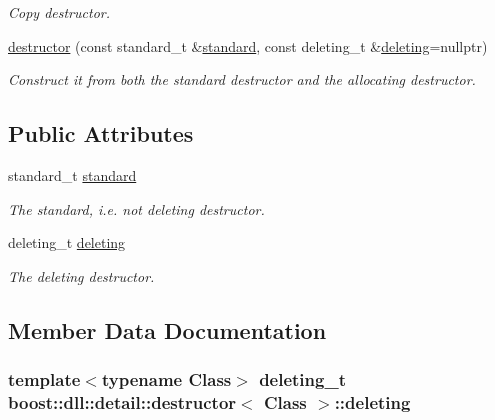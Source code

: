 \begin{DoxyCompactItemize}
\begin{DoxyCompactList}\small\item\em Copy destructor. \end{DoxyCompactList}\item 
\hyperlink{a00076_abc1f0cdcc708f43049b7d11727e24f24}{destructor} (const standard\+\_\+t \&\hyperlink{a00076_a5c588780f2142ca3492ea78c62fe472c}{standard}, const deleting\+\_\+t \&\hyperlink{a00076_a96ad279626c7f9b845d47582f9f88dc0}{deleting}=nullptr)\hypertarget{a00076_abc1f0cdcc708f43049b7d11727e24f24}{}\label{a00076_abc1f0cdcc708f43049b7d11727e24f24}

\begin{DoxyCompactList}\small\item\em Construct it from both the standard destructor and the allocating destructor. \end{DoxyCompactList}\end{DoxyCompactItemize}
\subsection*{Public Attributes}
\begin{DoxyCompactItemize}
\item 
standard\+\_\+t \hyperlink{a00076_a5c588780f2142ca3492ea78c62fe472c}{standard}
\begin{DoxyCompactList}\small\item\em The standard, i.\+e. not deleting destructor. \end{DoxyCompactList}\item 
deleting\+\_\+t \hyperlink{a00076_a96ad279626c7f9b845d47582f9f88dc0}{deleting}
\begin{DoxyCompactList}\small\item\em The deleting destructor. \end{DoxyCompactList}\end{DoxyCompactItemize}


\subsection{Member Data Documentation}
\subsubsection[{\texorpdfstring{deleting}{deleting}}]{\setlength{\rightskip}{0pt plus 5cm}template$<$typename Class$>$ deleting\+\_\+t {\bf boost\+::dll\+::detail\+::destructor}$<$ Class $>$\+::deleting}\hypertarget{a00076_a96ad279626c7f9b845d47582f9f88dc0}{}\label{a00076_a96ad279626c7f9b845d47582f9f88dc0}


